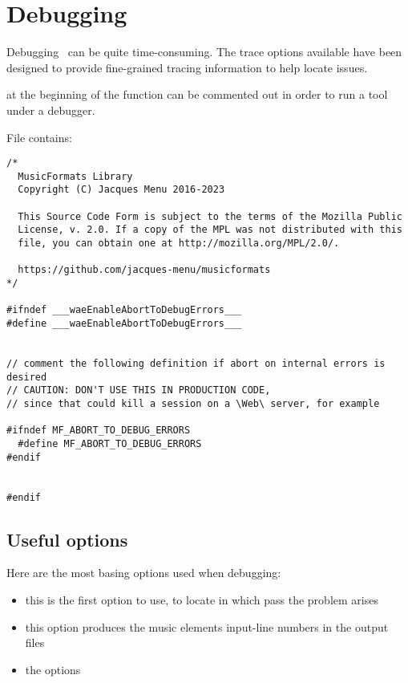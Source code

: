

\chapter{Debugging}

Debugging \mf\ can be quite time-consuming. The trace options available have been designed to provide fine-grained tracing information to help locate issues.

 at the beginning of the  function can be commented out in order to run a tool under a debugger.

File  contains:
\begin{lstlisting}[language=CPlusPlus]
/*
  MusicFormats Library
  Copyright (C) Jacques Menu 2016-2023

  This Source Code Form is subject to the terms of the Mozilla Public
  License, v. 2.0. If a copy of the MPL was not distributed with this
  file, you can obtain one at http://mozilla.org/MPL/2.0/.

  https://github.com/jacques-menu/musicformats
*/

#ifndef ___waeEnableAbortToDebugErrors___
#define ___waeEnableAbortToDebugErrors___


// comment the following definition if abort on internal errors is desired
// CAUTION: DON'T USE THIS IN PRODUCTION CODE,
// since that could kill a session on a \Web\ server, for example

#ifndef MF_ABORT_TO_DEBUG_ERRORS
  #define MF_ABORT_TO_DEBUG_ERRORS
#endif


#endif
\end{lstlisting}


\section{Useful options}

Here are the most basing options used when debugging:
\begin{itemize}
\item {}
	this is the first option to use, to locate in which pass the problem arises

\item {}
	this option produces the music elements input-line numbers in the output files

\item the  options

\end{itemize}


